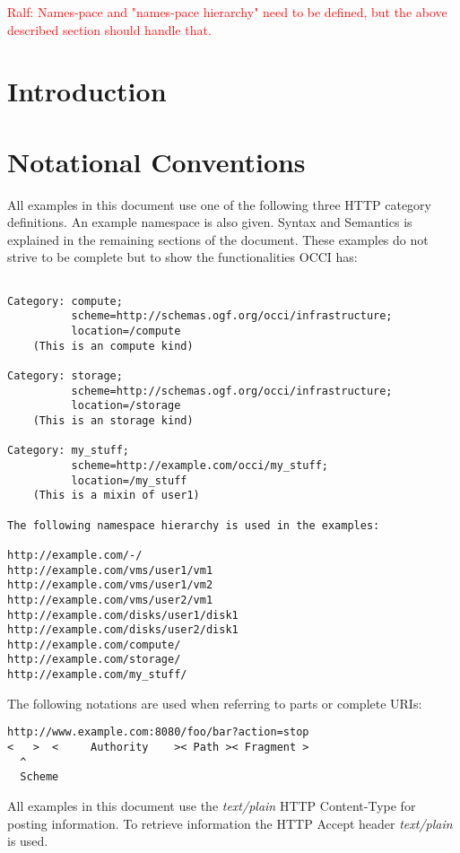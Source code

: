 \documentclass[10pt,a4paper]{article}
\newcommand{\ralf}[1]{\textcolor{red}{Ralf: #1}}
\begin{document}
\ralf{Names-pace and "names-pace hierarchy" need to be defined, but the above
described section should handle that.}

\newpage
\tableofcontents
\newpage

\section{Introduction}


\section{Notational Conventions}


All examples in this document use one of the following three HTTP
category definitions. An example namespace is also given. Syntax and
Semantics is explained in the remaining sections of the
document. These examples do not strive to be complete but to show the
functionalities OCCI has:

\begin{verbatim}

Category: compute;
          scheme=http://schemas.ogf.org/occi/infrastructure;
          location=/compute 
    (This is an compute kind)

Category: storage;
          scheme=http://schemas.ogf.org/occi/infrastructure;
          location=/storage 
    (This is an storage kind)

Category: my_stuff;
          scheme=http://example.com/occi/my_stuff;
          location=/my_stuff 
    (This is a mixin of user1)

The following namespace hierarchy is used in the examples:

http://example.com/-/
http://example.com/vms/user1/vm1
http://example.com/vms/user1/vm2
http://example.com/vms/user2/vm1
http://example.com/disks/user1/disk1
http://example.com/disks/user2/disk1
http://example.com/compute/
http://example.com/storage/
http://example.com/my_stuff/
\end{verbatim}

The following notations are used when referring to parts or complete
URIs:

\begin{verbatim}
http://www.example.com:8080/foo/bar?action=stop
<   >  <     Authority    >< Path >< Fragment >
  ^
  Scheme
\end{verbatim}

All examples in this document use the \emph{text/plain} HTTP
Content-Type for posting information. To retrieve information the HTTP
Accept header \emph{text/plain} is used.
\end{document}
